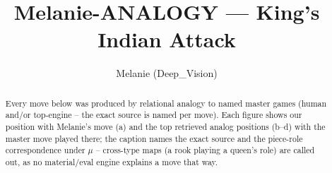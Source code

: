 \documentclass[11pt]{article}
\title{Melanie-ANALOGY — King's Indian Attack}
\author{Melanie (Deep\_Vision)}
\date{}
\begin{document}
\maketitle

\begin{abstract}Every move below was produced by relational analogy to named master games (human and/or top-engine -- the exact source is named per move). Each figure shows our position with Melanie's move (a) and the top retrieved analog positions (b--d) with the master move played there; the caption names the exact source and the piece-role correspondence under $\mu$ -- cross-type maps (a rook playing a queen's role) are called out, as no material/eval engine explains a move that way.\end{abstract}

\begin{figure}[p]\centering
\begin{subfigure}{0.46\textwidth}\centering
\resizebox{\linewidth}{!}{%
\newchessgame
\chessboard[
  setfen={rnbq1rk1/pp2bppp/4pn2/2pp4/8/3P1NP1/PPPNPPBP/R1BQ1RK1 w - - 0 7},
  showmover=false,
  pgfstyle=straightmove, color=movearrow, markmove={h2-h4}
]}
\caption{}
\end{subfigure}\hfill
\begin{subfigure}{0.46\textwidth}\centering
\resizebox{\linewidth}{!}{%
\newchessgame
\chessboard[
  setfen={r1bq1rk1/pppnppbp/3p1np1/8/2PP4/5NP1/PPQ1PPBP/RNB2RK1 b - - 2 7},
  showmover=false,
  pgfstyle=straightmove, color=movearrow, markmove={e7-e5}
]}
\caption{}
\end{subfigure}
\\[4pt]
\begin{subfigure}{0.46\textwidth}\centering
\resizebox{\linewidth}{!}{%
\newchessgame
\chessboard[
  setfen={r1bq1rk1/pppnppbp/3p1np1/8/2PP4/5NP1/PPQ1PPBP/RNB2RK1 b - - 2 7},
  showmover=false,
  pgfstyle=straightmove, color=movearrow, markmove={e7-e5}
]}
\caption{}
\end{subfigure}\hfill
\begin{subfigure}{0.46\textwidth}\centering
\resizebox{\linewidth}{!}{%
\newchessgame
\chessboard[
  setfen={r1bq1rk1/pppnppbp/3p1np1/8/2PP4/5NP1/PPQ1PPBP/RNB2RK1 b - - 3 7},
  showmover=false,
  pgfstyle=straightmove, color=movearrow, markmove={e7-e5}
]}
\caption{}
\end{subfigure}

\end{figure}
\end{document}

